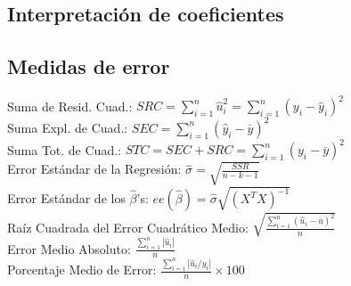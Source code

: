 \documentclass[10pt, a4paper, landscape]{extarticle}
\begin{document}
\begin{multicols}{3}
	\subsection*{Interpretación de coeficientes}
	\subsection*{Medidas de error}
		Suma de Resid. Cuad.: \hfill $SRC = \sum_{i=1}^n \hat{u}_i^2 = \sum_{i=1}^n (y_i - \hat{y}_i)^2$
		\\ Suma Expl. de Cuad.: \hfill $SEC = \sum_{i=1}^n (\hat{y}_i - \overline{y})^2$
		\\ Suma Tot. de Cuad.: \hfill $STC = SEC + SRC = \sum_{i=1}^n (y_i - \overline{y})^2$
		\\ Error Estándar de la Regresión: \hfill $\hat{\sigma} = \sqrt{\frac{SSR}{n-k-1}}$
		\\ Error Estándar de los $\hat{\beta}$'s: \hfill $ee(\hat{\beta}) = \hat{\sigma} \sqrt{(X^T X)^{-1}}$
		\\ Raíz Cuadrada del Error Cuadrático Medio: \hfill $\sqrt{\frac{\sum_{i=1}^n (\hat{u}_i - \overline{u})^2}{n}}$
		\\ Error Medio Absoluto: \hfill $\frac{\sum_{i=1}^n |\hat{u}_i|}{n}$
		\\ Porcentaje Medio de Error: \hfill $\frac{\sum_{i=1}^n |\hat{u}_i / y_i|}{n} \times 100$

\columnbreak


\end{multicols}
\end{document}
